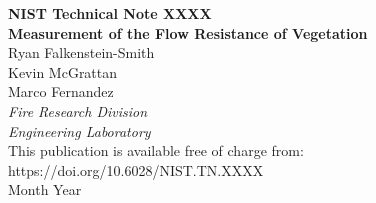\documentclass[12pt]{article}
\newcommand{\pubnumber}{XXXX}
\newcommand{\DOI}{https://doi.org/10.6028/NIST.TN.XXXX}
\newcommand{\monthyear}{Month Year}
\begin{document}
\newpage

\hspace{5in}

\newpage

\begin{titlepage}
\begin{flushright}
\LARGE{\textbf{NIST Technical Note \pubnumber}}\\
\vfill
\Huge{\textbf{Measurement of the Flow Resistance of Vegetation}}\\
\vfill
\normalsize Ryan Falkenstein-Smith\\
Kevin McGrattan\\
Marco Fernandez\\
\textit{Fire Research Division}\\
\textit{Engineering Laboratory}\\
\vspace{12pt}
\vfill
\normalsize This publication is available free of charge from:\\
\DOI\\
\vfill
\normalsize \monthyear
\vfill


\end{flushright}
\end{titlepage}
\end{document}
